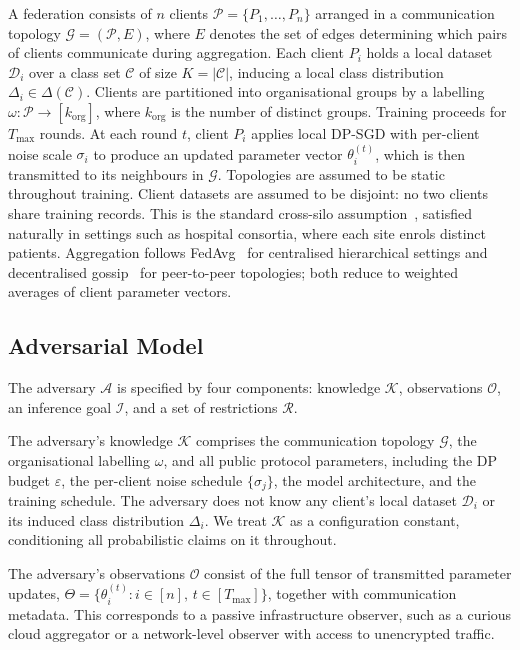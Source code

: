 \documentclass[letterpaper,journal]{IEEEtran}
\begin{document}
A federation consists of $n$ clients $\mathcal{P} = \{P_1,\ldots,P_n\}$
arranged in a communication topology $\mathcal{G} = (\mathcal{P}, E)$,
where $E$ denotes the set of edges determining which pairs of clients
communicate during aggregation. Each client $P_i$ holds a local dataset $\mathcal{D}_i$ over a class set $\mathcal{C}$ of size $K = |\mathcal{C}|$, inducing a local class distribution $\Delta_i \in \Delta(\mathcal{C})$. Clients are partitioned into organisational groups by a labelling $\omega : \mathcal{P} \to [k_{\mathrm{org}}]$, where $k_{\mathrm{org}}$ is the number of distinct groups. Training proceeds for $T_{\max}$ rounds. At each round $t$, client $P_i$ applies local DP-SGD with per-client noise scale $\sigma_i$ to
produce an updated parameter vector $\theta_i^{(t)}$, which is then
transmitted to its neighbours in $\mathcal{G}$. Topologies are assumed
to be static throughout training. Client datasets are assumed to be disjoint: no two clients share
training records. This is the standard cross-silo
assumption~\cite{wang2021fieldguide}, satisfied naturally in settings
such as hospital consortia, where each site enrols distinct patients.
Aggregation follows FedAvg~\cite{mcmahan2018dpfedavg} for centralised
hierarchical settings and decentralised
gossip~\cite{hegedus2021decentralized} for peer-to-peer topologies;
both reduce to weighted averages of client parameter vectors.

\subsection{Adversarial Model}
\label{sec:adv-model}

The adversary $\mathcal{A}$ is specified by four components: knowledge
$\mathcal{K}$, observations $\mathcal{O}$, an inference goal
$\mathcal{I}$, and a set of restrictions $\mathcal{R}$.

The adversary's knowledge $\mathcal{K}$ comprises the communication
topology $\mathcal{G}$, the organisational labelling $\omega$, and all
public protocol parameters, including the DP budget $\varepsilon$, the
per-client noise schedule $\{\sigma_j\}$, the model architecture, and
the training schedule. The adversary does not know any client's local
dataset $\mathcal{D}_i$ or its induced class distribution $\Delta_i$.
We treat $\mathcal{K}$ as a configuration constant, conditioning all
probabilistic claims on it throughout.

The adversary's observations $\mathcal{O}$ consist of the full tensor
of transmitted parameter updates,
$\Theta = \{\theta_i^{(t)} : i \in [n],\, t \in [T_{\max}]\}$, together
with communication metadata. This corresponds to a passive
infrastructure observer, such as a curious cloud aggregator or a
network-level observer with access to unencrypted traffic.
\end{document}
